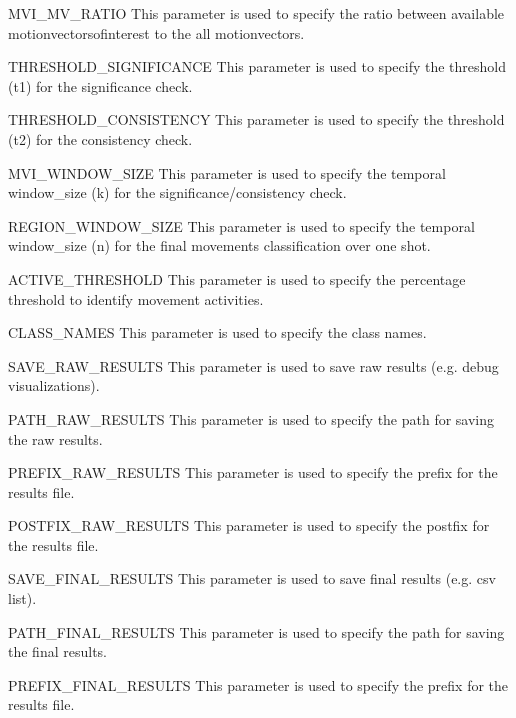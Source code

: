 \documentclass[letterpaper,10pt,english,openany,oneside]{sphinxmanual}
\begin{document}
MVI\_MV\_RATIO
This parameter is used to specify the ratio between available motion\sphinxhyphen{}vectors\sphinxhyphen{}of\sphinxhyphen{}interest to the all motion\sphinxhyphen{}vectors.



THRESHOLD\_SIGNIFICANCE
This parameter is used to specify the threshold (t1) for the significance check.



THRESHOLD\_CONSISTENCY
This parameter is used to specify the threshold (t2) for the consistency check.



MVI\_WINDOW\_SIZE
This parameter is used to specify the temporal window\_size (k) for the significance/consistency check.



REGION\_WINDOW\_SIZE
This parameter is used to specify the temporal window\_size (n) for the final movements classification over one shot.



ACTIVE\_THRESHOLD
This parameter is used to specify the percentage threshold to identify movement activities.



CLASS\_NAMES
This parameter is used to specify the class names.



SAVE\_RAW\_RESULTS
This parameter is used to save raw results (e.g. debug visualizations).



PATH\_RAW\_RESULTS
This parameter is used to specify the path for saving the raw results.



PREFIX\_RAW\_RESULTS
This parameter is used to specify the prefix for the results file.



POSTFIX\_RAW\_RESULTS
This parameter is used to specify the postfix for the results file.



SAVE\_FINAL\_RESULTS
This parameter is used to save final results (e.g. csv list).



PATH\_FINAL\_RESULTS
This parameter is used to specify the path for saving the final results.



PREFIX\_FINAL\_RESULTS
This parameter is used to specify the prefix for the results file.
\end{document}
